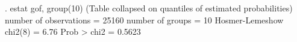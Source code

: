 . estat gof, group(10)
{\smallskip}
{}
{\smallskip}
  (Table collapsed on quantiles of estimated probabilities)
{\smallskip}
       number of observations =     25160
             number of groups =        10
      Hosmer-Lemeshow chi2(8) =         6.76
                  Prob > chi2 =         0.5623
{\smallskip}
